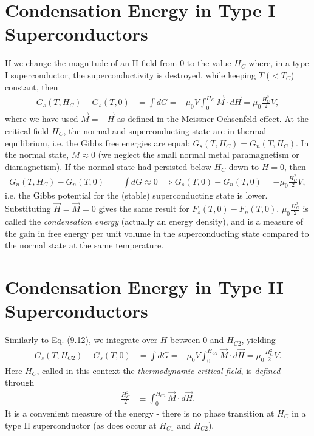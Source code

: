\documentclass[qo.tex]{subfiles}
\begin{document}
\section{Condensation Energy in Type I Superconductors}
If we change the magnitude of an H field from 0 to the value $H_C$ where, in a type I superconductor, the superconductivity is destroyed, while keeping $T$ ($<T_C$) constant, then
\begin{align}
    G_s(T,H_C) - G_s(T,0) &= \int dG = -\mu_0 V\int_0^{H_C} \vec{M}\cdot d\vec{H} = \mu_0\frac{H_C^2}{2}V,
\end{align}
where we have used $\vec{M}=-\vec{H}$ as defined in the Meissner-Ochsenfeld effect.
At the critical field $H_C$, the normal and superconducting state are in thermal equilibrium, i.e. the Gibbs free energies are equal: $G_s(T,H_C) = G_n(T,H_C)$.
In the normal state, $M\approx0$ (we neglect the small normal metal paramagnetism or diamagnetism). 
If the normal state had persisted below $H_C$ down to $H=0$, then 
\begin{align}
    G_n(T,H_C) - G_n(T,0) &= \int dG \approx 0 \implies G_s(T,0) - G_n(T,0) = -\mu_0\frac{H_C^2}{2}V,
\end{align}
i.e. the Gibbs potential for the (stable) superconducting state is lower. 
Substituting $\vec{H}=\vec{M}=0$ gives the same result for $F_s(T,0)-F_n(T,0)$.
$\mu_0\frac{H_C^2}{2}$ is called the \emph{condensation energy} (actually an energy density), and is a measure of the gain in free energy per unit volume in the superconducting state compared to the normal state at the same temperature. 

\section{Condensation Energy in Type II Superconductors}
Similarly to Eq. (9.12), we integrate over $H$ between 0 and $H_{C2}$, yielding
\begin{align}
    G_s(T,H_{C2}) - G_s(T,0) &= \int dG = -\mu_0V\int_0^{H_{C2}}\vec{M}\cdot d\vec{H} = \mu_0\frac{H_C^2}{2}V.
\end{align}
Here $H_C$, called in this context the \emph{thermodynamic critical field}, is \emph{defined} through 
\begin{align}
    \frac{H_C^2}{2} &\equiv \int_0^{H_{C2}}\vec{M}\cdot d\vec{H}.
\end{align}
It is a convenient measure of the energy - there is no phase transition at $H_C$ in a type II superconductor (as does occur at $H_{C1}$ and $H_{C2}$).
\end{document}
